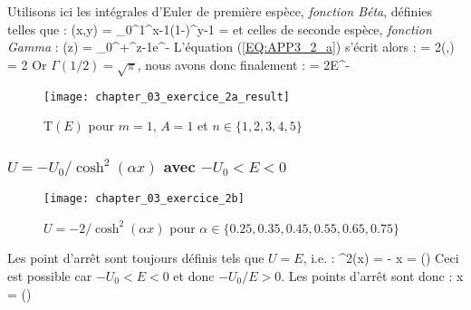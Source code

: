 \ee
Utilisons ici les int\'egrales d'Euler de premi\`ere esp\`ece, \emph{fonction Béta}, d\'efinies telles que :
\be
	(x,y) = \int_{0}^{1}^{x-1}(1-)^{y-1} =  \label{EQ:INT_EULER_BETA}
\ee
et celles de seconde esp\`ece, \emph{fonction Gamma} :
\be
	\Gamma(z) = \int_{0}^{+\infty}^{z-1}e^{-} \label{EQ:INT_EULER_GAMMA}
\ee
L'\'equation (\ref{EQ:APP3_2_a}) s'\'ecrit alors :
\benn
	 = 2\left(,\right) = 2
\eenn
Or $\Gamma(1/2) = \sqrt{\pi}$, nous avons donc finalement :
\be
	 = 2E^{-} \label{EQ:11_EX2A_1}
\ee

\begin{figure}[htb!]
	\begin{center}
		\texttt{[image: chapter\_03\_exercice\_2a\_result]}
		\caption{$\mathrm{T}(E)$ pour $m=1$, $A=1$ et $n \in \{1,2,3,4,5\}$}\label{FIG:3_2_a_result}
	\end{center}
\end{figure}

\subsubsection{$U = -U_{0}/\cosh^{2}(\alpha x)$ avec $-U_{0} < E < 0$}

\begin{figure}[htb!]
	\begin{center}
		\texttt{[image: chapter\_03\_exercice\_2b]}
		\caption{$U = -2 / \cosh^{2}(\alpha x)$ pour $\alpha \in \{0.25,0.35,0.45,0.55,0.65,0.75\}$}\label{FIG:3_2_b}
	\end{center}
\end{figure}

Les point d'arr\^et sont toujours d\'efinis tels que $U=E$, i.e. :
\benn
	\cosh^{2}(\alpha x) = - \Leftrightarrow \alpha x = \pm \arccosh\left(\right)
\eenn
Ceci est possible car $-U_{0} < E < 0$ et donc $-U_{0}/E > 0$. Les points d'arr\^et sont donc :
\benn
	x = \pm {}\arccosh\left(\right)
\eenn

